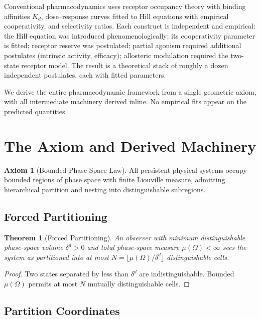 \documentclass[twocolumn,10pt,a4paper]{article}
\newtheorem{theorem}{Theorem}[section]
\theoremstyle{definition}
\newtheorem{axiom}{Axiom}
\theoremstyle{remark}
\begin{document}
Conventional pharmacodynamics uses receptor occupancy theory with binding affinities $K_d$, dose--response curves fitted to Hill equations with empirical cooperativity, and selectivity ratios. Each construct is independent and empirical: the Hill equation was introduced phenomenologically; its cooperativity parameter is fitted; receptor reserve was postulated; partial agonism required additional postulates (intrinsic activity, efficacy); allosteric modulation required the two-state receptor model. The result is a theoretical stack of roughly a dozen independent postulates, each with fitted parameters.

We derive the entire pharmacodynamic framework from a single geometric axiom, with all intermediate machinery derived inline. No empirical fits appear on the predicted quantities.

\section{The Axiom and Derived Machinery}

\begin{axiom}[Bounded Phase Space Law]
\label{ax:bps}
All persistent physical systems occupy bounded regions of phase space with finite Liouville measure, admitting hierarchical partition and nesting into distinguishable subregions.
\end{axiom}

\subsection{Forced Partitioning}

\begin{theorem}[Forced Partitioning]
An observer with minimum distinguishable phase-space volume $\delta^d > 0$ and total phase-space measure $\mu(\Omega) < \infty$ sees the system as partitioned into at most $N = \lfloor\mu(\Omega)/\delta^d\rfloor$ distinguishable cells.
\end{theorem}

\begin{proof}
Two states separated by less than $\delta^d$ are indistinguishable. Bounded $\mu(\Omega)$ permits at most $N$ mutually distinguishable cells.
\end{proof}

\subsection{Partition Coordinates}
\end{document}
